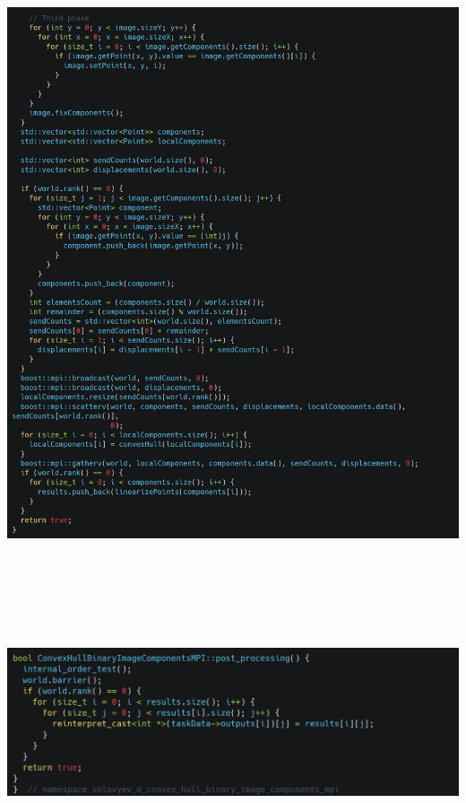 \documentclass[a4paper]{article}
\begin{document}
\begin{center}
\includegraphics[width=481.95pt,height=565.31pt]{report-img007.png}
\end{center}

\bigskip


\bigskip


\bigskip


\begin{center}
\includegraphics[width=481.95pt,height=157.8pt]{report-img008.png}
\end{center}
\end{document}
